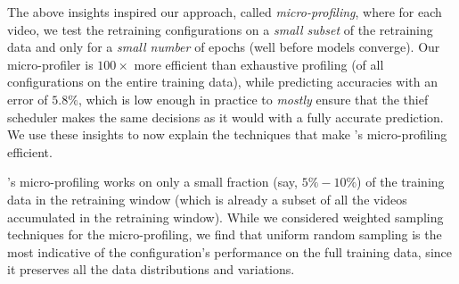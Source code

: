 The above insights inspired our approach, called {\em micro-profiling}, where 
for each video, we test the retraining configurations on a {\em small subset} of the retraining data and only for a {\em small number} of epochs (well before models converge). %
Our micro-profiler is $100\times$ more efficient than exhaustive profiling (of all configurations on the entire training data), while predicting accuracies with an error of $5.8\%$, %
which is low enough in practice to {\em mostly} ensure that the thief scheduler makes the same decisions as it would with a fully accurate prediction. %
We use these insights to now explain the techniques that make {\name}'s micro-profiling efficient.



{\name}'s micro-profiling works on only a small fraction (say, $5\%-10\%$) of the training data in the retraining window (which is already a subset of all the videos accumulated in the retraining window). While we considered weighted sampling techniques for the micro-profiling, we find that uniform random sampling is the most indicative of the configuration's performance on the full training data, since it preserves all the data distributions and variations. %

